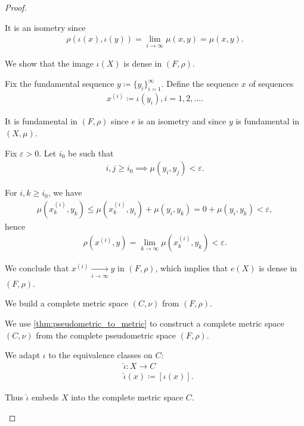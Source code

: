 \begin{proof}
\begin{defenum}
    It is an isometry since
    \begin{align*}
      \rho(\iota(x),\iota(y)) = \lim_{i \to \infty} \mu(x, y) = \mu(x, y).
    \end{align*}

    \item\label{thm:metric_space_completion_existence/part_d} We show that the image $\iota(X)$ is dense in $(F, \rho)$.

    Fix the fundamental sequence $y \coloneqq \{ y_i \}_{i=1}^\infty$. Define the sequence $x$ of sequences
    \begin{align*}
      x^{(i)} \coloneqq \iota(y_i), i = 1, 2, \ldots.
    \end{align*}

    It is fundamental in $(F, \rho)$ since $e$ is an isometry and since $y$ is fundamental in $(X, \mu)$.

    Fix $\varepsilon > 0$. Let $i_0$ be such that
    \begin{align*}
      i, j \geq i_0 \implies \mu(y_i, y_j) < \varepsilon.
    \end{align*}

    For $i, k \geq i_0$, we have
    \begin{align*}
      \mu(x_k^{(i)}, y_k)
      \leq
      \mu(x_k^{(i)}, y_i) + \mu(y_i, y_k)
      =
      0 + \mu(y_i, y_k)
      <
      \varepsilon,
    \end{align*}
    hence
    \begin{align*}
      \rho(x^{(i)}, y) = \lim_{k \to \infty} \mu(x_k^{(i)}, y_k) < \varepsilon.
    \end{align*}

    We conclude that $x^{(i)} \xrightarrow[i \to \infty]{} y$ in $(F, \rho)$, which implies that $e(X)$ is dense in $(F, \rho)$.

    \item\label{thm:metric_space_completion_existence/part_e} We build a complete metric space $(C, \nu)$ from $(F, \rho)$.

    We use \cref{thm:pseudometric_to_metric} to construct a complete metric space $(C, \nu)$ from the complete pseudometric space $(F, \rho)$.

    We adapt $\iota$ to the equivalence classes on $C$:
    \begin{align*}
      &\hat\iota: X \to C \\
      &\hat\iota(x) \coloneqq [\iota(x)].
    \end{align*}

    Thus $\hat\iota$ embeds $X$ into the complete metric space $C$.
  \end{defenum}
\end{proof}

